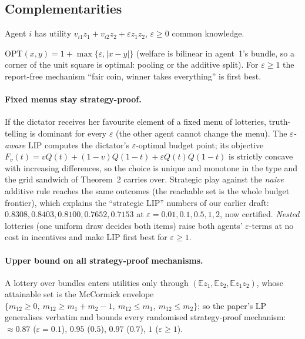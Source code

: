 \subsection{Complementarities}

Agent $i$ has utility $v_{i1}z_1+v_{i2}z_2+\varepsilon z_1z_2$, $\varepsilon\ge0$ common knowledge.

\begin{proposition}
$\mathrm{OPT}(x,y)=1+\max\{\varepsilon,|x-y|\}$ (welfare is bilinear in agent~1's bundle, so a corner of the
unit square is optimal: pooling or the additive split). For $\varepsilon\ge1$ the report-free mechanism
``fair coin, winner takes everything'' is first best.
\end{proposition}

\paragraph{Fixed menus stay strategy-proof.} If the dictator receives her favourite element of a fixed
menu of lotteries, truth-telling is dominant for every $\varepsilon$ (the other agent cannot change the
menu). The \emph{$\varepsilon$-aware} LIP computes the dictator's $\varepsilon$-optimal budget point; its
objective $F_v(t)=vQ(t)+(1-v)Q(1-t)+\varepsilon Q(t)Q(1-t)$ is strictly concave with increasing differences,
so the choice is unique and monotone in the type and the grid sandwich of Theorem~2 carries over. Strategic
play against the \emph{naive} additive rule reaches the same outcomes (the reachable set is the whole budget
frontier), which explains the ``strategic LIP'' numbers of our earlier draft: $0.8308,0.8403,0.8100,0.7652,
0.7153$ at $\varepsilon=0.01,0.1,0.5,1,2$, now certified. \emph{Nested} lotteries (one uniform draw decides
both items) raise both agents' $\varepsilon$-terms at no cost in incentives and make LIP first best for
$\varepsilon\ge1$.

\paragraph{Upper bound on all strategy-proof mechanisms.} A lottery over bundles enters utilities only
through $(\mathbb E z_1,\mathbb E z_2,\mathbb E z_1z_2)$, whose attainable set is the McCormick envelope
$\{m_{12}\ge0,\ m_{12}\ge m_1+m_2-1,\ m_{12}\le m_1,\ m_{12}\le m_2\}$; so the paper's LP generalises verbatim
and bounds every randomised strategy-proof mechanism: $\approx0.87$ ($\varepsilon=0.1$), $0.95$ ($0.5$),
$0.97$ ($0.7$), $1$ ($\varepsilon\ge1$).


